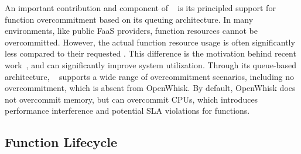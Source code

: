 An important contribution and component of \sysname~ is its principled support for function overcommitment based on its queuing architecture.
In many environments, like public FaaS providers, function resources cannot be overcommitted. 
However, the actual function resource usage is often significantly less compared to their requested .
This difference is the motivation behind recent  work~\cite{akhtar_cose_2020, guo_decomposing_2022, tian_owl_2022, eismann2021sizeless, kotni2021faastlane}, and can significantly improve system utilization.
Through its queue-based architecture, \sysname~ supports a wide range of overcommitment scenarios, including no overcommitment, which is absent from OpenWhisk.
By default, OpenWhisk does not overcommit memory, but can  overcommit CPUs, which introduces performance interference and potential SLA violations for functions. 





\subsection{Function Lifecycle}
\label{sec:design:lifecycle}

